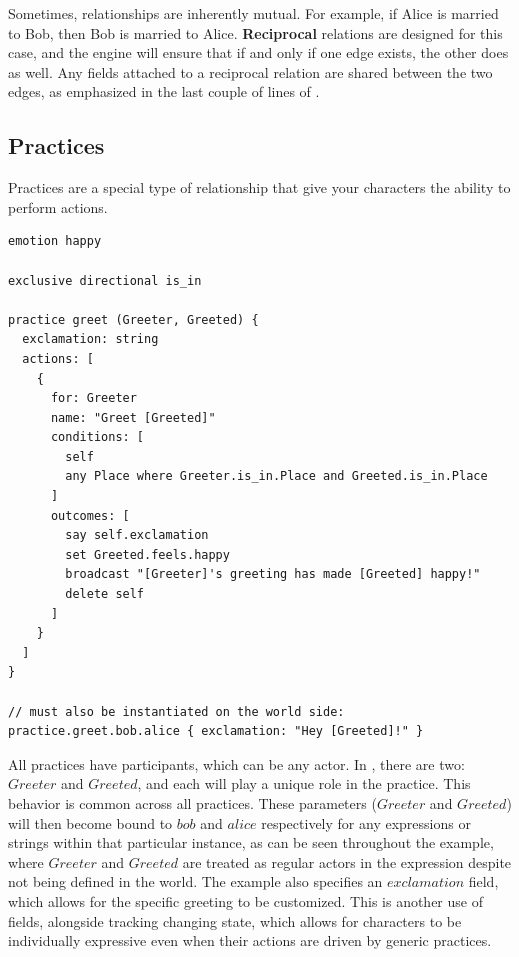 Sometimes, relationships are inherently mutual. For example, if Alice is married to Bob,
then Bob is married to Alice. \textbf{Reciprocal} relations are designed for this case, and the
engine will ensure that if and only if one edge exists, the other does as well. Any
fields attached to a reciprocal relation are shared between the two edges, as emphasized
in the last couple of lines of .

\subsection{Practices}

Practices are a special type of relationship that give your characters the ability to perform actions.

\begin{lstlisting}[float=hb, caption=A simple example practice allowing for two characters to greet each other., label=lst:ExamplePractice]
emotion happy

exclusive directional is_in

practice greet (Greeter, Greeted) {
  exclamation: string
  actions: [
    {
      for: Greeter
      name: "Greet [Greeted]"
      conditions: [
        self
        any Place where Greeter.is_in.Place and Greeted.is_in.Place
      ]
      outcomes: [
        say self.exclamation
        set Greeted.feels.happy
        broadcast "[Greeter]'s greeting has made [Greeted] happy!"
        delete self
      ]
    }
  ]
}

// must also be instantiated on the world side:
practice.greet.bob.alice { exclamation: "Hey [Greeted]!" }
\end{lstlisting}

All practices have participants, which can be any actor. In , there are two: $Greeter$
and $Greeted$, and each will play a unique role in the practice. This behavior is
common across all practices. These parameters ($Greeter$ and $Greeted$) will then become
bound to $bob$ and $alice$ respectively for any expressions or strings within that
particular instance, as can be seen throughout the example, where $Greeter$ and
$Greeted$ are treated as regular actors in the expression despite not being defined
in the world. The example also specifies an $exclamation$ field, which
allows for the specific greeting to be customized. This is another use of fields,
alongside tracking changing state, which allows for characters to be individually
expressive even when their actions are driven by generic practices.

